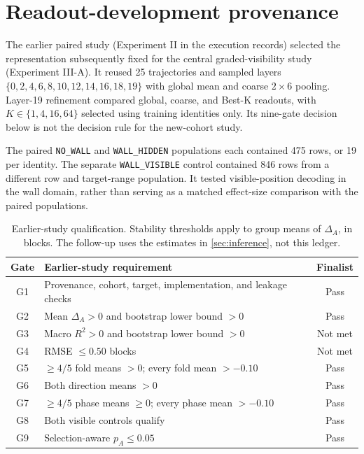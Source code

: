 \documentclass{article}
\begin{document}
\section{Readout-development provenance}
\label{app:additional-detail}
\label{app:exp2-qualification}
The earlier paired study (Experiment II in the execution records) selected the representation subsequently fixed for the central graded-visibility study (Experiment III-A). It reused 25 trajectories and sampled layers $\{0,2,4,6,8,10,12,14,16,18,19\}$ with global mean and coarse $2\times6$ pooling. Layer-19 refinement compared global, coarse, and Best-K readouts, with $K\in\{1,4,16,64\}$ selected using training identities only. Its nine-gate decision below is not the decision rule for the new-cohort study.

The paired \texttt{NO\_WALL} and \texttt{WALL\_HIDDEN} populations each contained 475 rows, or 19 per identity. The separate \texttt{WALL\_VISIBLE} control contained 846 rows from a different row and target-range population. It tested visible-position decoding in the wall domain, rather than serving as a matched effect-size comparison with the paired populations.

\begin{table}[!htbp]
\caption{Earlier-study qualification. Stability thresholds apply to group means of $\Delta_A$, in blocks. The follow-up uses the estimates in \autoref{sec:inference}, not this ledger.}
\label{tab:gates}
\centering
\small
\begin{tabular}{clc}
\toprule
Gate & Earlier-study requirement & Finalist\\
\midrule
G1 & Provenance, cohort, target, implementation, and leakage checks & Pass\\
G2 & Mean $\Delta_A>0$ and bootstrap lower bound $>0$ & Pass\\
G3 & Macro $R^2>0$ and bootstrap lower bound $>0$ & Not met\\
G4 & RMSE $\leq0.50$ blocks & Not met\\
G5 & $\geq4/5$ fold means $>0$; every fold mean $>-0.10$ & Pass\\
G6 & Both direction means $>0$ & Pass\\
G7 & $\geq4/5$ phase means $\geq0$; every phase mean $>-0.10$ & Pass\\
G8 & Both visible controls qualify & Pass\\
G9 & Selection-aware $p_A\leq0.05$ & Pass\\
\bottomrule
\end{tabular}
\end{table}
\end{document}
